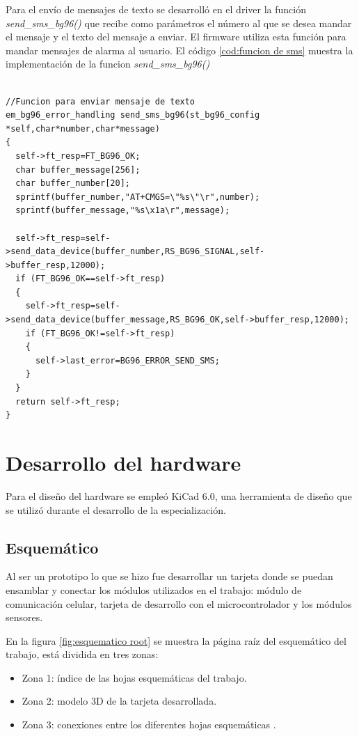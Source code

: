 Para el envío de mensajes de texto se desarrolló en el driver la función \emph{send\_sms\_bg96()} que recibe como parámetros el número al que se desea mandar el mensaje y el texto del mensaje a enviar. El firmware utiliza esta función para mandar mensajes de alarma al usuario.
El código \ref{cod:funcion de sms} muestra la implementación de la funcion \emph{send\_sms\_bg96()}
\begin{lstlisting}[label=cod:funcion de sms,caption=Función para enviar sms.]  % Start your code-block

//Funcion para enviar mensaje de texto 
em_bg96_error_handling send_sms_bg96(st_bg96_config *self,char*number,char*message)
{
  self->ft_resp=FT_BG96_OK;
  char buffer_message[256];
  char buffer_number[20];
  sprintf(buffer_number,"AT+CMGS=\"%s\"\r",number);
  sprintf(buffer_message,"%s\x1a\r",message);
  
  self->ft_resp=self->send_data_device(buffer_number,RS_BG96_SIGNAL,self->buffer_resp,12000);
  if (FT_BG96_OK==self->ft_resp)
  {
    self->ft_resp=self->send_data_device(buffer_message,RS_BG96_OK,self->buffer_resp,12000);
    if (FT_BG96_OK!=self->ft_resp)
    {
      self->last_error=BG96_ERROR_SEND_SMS;
    }
  }
  return self->ft_resp;
}
\end{lstlisting}

\section{Desarrollo del hardware}

Para el diseño del hardware se empleó KiCad 6.0, una herramienta de diseño que se utilizó durante el desarrollo de la especialización.

\subsection{Esquemático} 
Al ser un prototipo lo que se hizo fue desarrollar un tarjeta donde se puedan ensamblar y conectar los módulos utilizados en el trabajo: módulo de comunicación celular, tarjeta de desarrollo con el microcontrolador y  los módulos sensores.

En la figura \ref{fig:esquematico root} se muestra la página raíz del esquemático del trabajo, está dividida en tres zonas:
\begin{itemize}
  \item Zona 1: índice de las hojas esquemáticas del trabajo.
  \item Zona 2: modelo 3D de la tarjeta desarrollada.
  \item Zona 3: conexiones entre los diferentes hojas esquemáticas .
\end{itemize}

